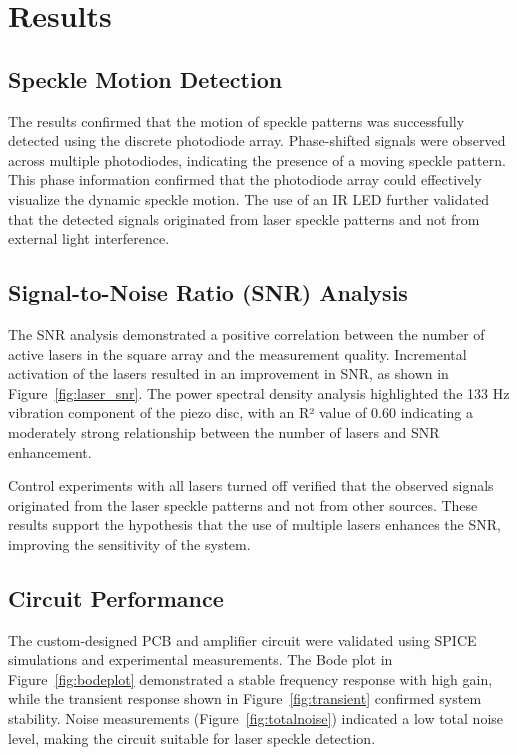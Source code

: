 \section{Results}
\label{sec:results}

\subsection{Speckle Motion Detection}

The results confirmed that the motion of speckle patterns was successfully detected using the discrete photodiode array. 
Phase-shifted signals were observed across multiple photodiodes, indicating the presence of a moving speckle pattern. 
This phase information confirmed that the photodiode array could effectively visualize the dynamic speckle motion. 
The use of an IR LED further validated that the detected signals originated from laser speckle patterns and not from external light interference.

\subsection{Signal-to-Noise Ratio (SNR) Analysis}

The SNR analysis demonstrated a positive correlation between the number of active lasers in the square array and the measurement quality. 
Incremental activation of the lasers resulted in an improvement in SNR, as shown in Figure~\ref{fig:laser_snr}. 
The power spectral density analysis highlighted the 133 Hz vibration component of the piezo disc, with an R² value of 0.60 indicating a moderately strong relationship between the number of lasers and SNR enhancement.

Control experiments with all lasers turned off verified that the observed signals originated from the laser speckle patterns and not from other sources. 
These results support the hypothesis that the use of multiple lasers enhances the SNR, improving the sensitivity of the system.

\subsection{Circuit Performance}

The custom-designed PCB and amplifier circuit were validated using SPICE simulations and experimental measurements. 
The Bode plot in Figure~\ref{fig:bodeplot} demonstrated a stable frequency response with high gain, while the transient response shown in Figure~\ref{fig:transient} confirmed system stability. 
Noise measurements (Figure~\ref{fig:totalnoise}) indicated a low total noise level, making the circuit suitable for laser speckle detection.

